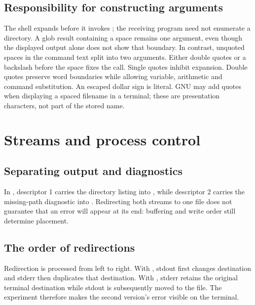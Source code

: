 \documentclass{../latex/utmreport}
\begin{document}
\section{Responsibility for constructing arguments}
The shell expands  before it invokes ; the receiving program
need not enumerate a directory. A glob result containing a space remains one
argument, even though the displayed output alone does not show that boundary.
In contrast, unquoted spaces in the command text split  into
two arguments. Either double quotes or a backslash before the space fixes the call.
Single quotes inhibit expansion. Double quotes preserve word boundaries while
allowing variable, arithmetic and command substitution. An escaped dollar sign is
literal. GNU  may add quotes when displaying a spaced filename in a
terminal; these are presentation characters, not part of the stored name.

\chapter{Streams and process control}
\section{Separating output and diagnostics}
In , descriptor 1 carries the directory
listing into , while descriptor 2 carries the missing-path diagnostic
into . Redirecting both streams to one file does not guarantee that
an error will appear at its end: buffering and write order still determine placement.

\section{The order of redirections}
Redirection is processed from left to right. With , stdout
first changes destination and stderr then duplicates that destination. With
, stderr retains the original terminal destination while
stdout is subsequently moved to the file. The experiment therefore makes the
second version's error visible on the terminal.
\end{document}
